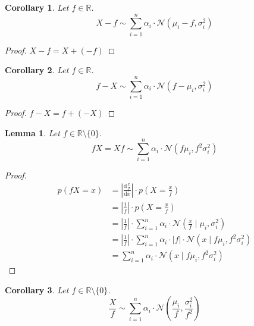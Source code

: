 \documentclass[11pt,a4paper]{report}
\newtheorem{lemma}{Lemma}
\newtheorem{corollary}{Corollary}
\begin{document}
\begin{corollary}
  Let $f \in \mathbb{R}$.
  \begin{equation*}
    X - f \sim \sum_{i = 1}^{n} \alpha_{i} \cdot \mathcal{N}(\mu_{i} - f, \sigma_{i}^{2})
  \end{equation*}
\end{corollary}

\begin{proof}
  $X - f = X + (-f)$
\end{proof}

\begin{corollary}
  Let $f \in \mathbb{R}$.
  \begin{equation*}
    f - X \sim \sum_{i = 1}^{n} \alpha_{i} \cdot \mathcal{N}(f - \mu_{i}, \sigma_{i}^{2})
  \end{equation*}
\end{corollary}

\begin{proof}
  $f - X = f + (-X)$
\end{proof}

\begin{lemma}
  Let $f \in \mathbb{R} \setminus \{ 0 \}$.
  \begin{equation*}
    fX = Xf \sim \sum_{i = 1}^{n} \alpha_{i} \cdot \mathcal{N}(f\mu_{i}, f^{2}\sigma_{i}^{2})
  \end{equation*}
\end{lemma}

\begin{proof}
  \begin{align*}
    p(fX = x) & = \left| \frac{\mathrm{d}\frac{x}{f}}{\mathrm{d}x} \right| \cdot p\left( X = \frac{x}{f} \right)\\
              & = \left|\frac{1}{f}\right| \cdot p\left( X = \frac{x}{f} \right)\\
              & = \left|\frac{1}{f}\right| \cdot \sum_{i = 1}^{n} \alpha_{i} \cdot \mathcal{N}\left(\frac{x}{f} \mid \mu_{i}, \sigma_{i}^{2}\right)\\
              & = \left|\frac{1}{f}\right| \cdot \sum_{i = 1}^{n} \alpha_{i} \cdot |f| \cdot \mathcal{N}\left(x \mid f\mu_{i}, f^{2}\sigma_{i}^{2}\right)\\
              & = \sum_{i = 1}^{n} \alpha_{i} \cdot \mathcal{N}\left(x \mid f\mu_{i}, f^{2}\sigma_{i}^{2}\right)
  \end{align*}
\end{proof}

\begin{corollary}
  Let $f \in \mathbb{R} \setminus \{ 0 \}$.
  \begin{equation*}
    \frac{X}{f} \sim \sum_{i = 1}^{n} \alpha_{i} \cdot \mathcal{N}\left( \frac{\mu_{i}}{f}, \frac{\sigma_{i}^{2}}{f^{2}} \right)
  \end{equation*}
\end{corollary}
\end{document}
